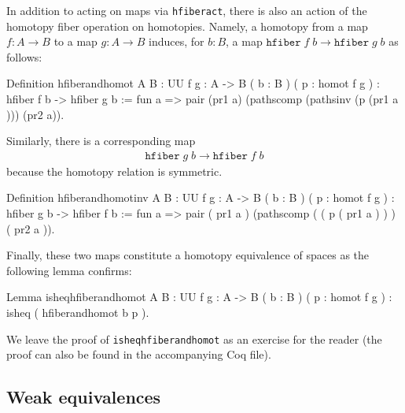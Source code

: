 In addition to acting on maps via \verb|hfiberact|, there is also
an action of the homotopy fiber operation on homotopies.  Namely, a
homotopy from a map $f:A\to B$ to a map $g:A\to B$ induces, for $b :
B$, a map $\texttt{hfiber}\;f\;b\to\texttt{hfiber}\;g\;b$ as follows:
\begin{center}
\begin{coqcode}
Definition hfiberandhomot { A B : UU } { f g : A -> B } ( b : B ) ( p : homot f g ) : hfiber f b -> hfiber g b := fun a => pair (pr1 a) (pathscomp (pathsinv (p (pr1 a ))) (pr2 a)). 
\end{coqcode}
\end{center}
Similarly, there is a corresponding map
\begin{align*}
  \texttt{hfiber}\;g\;b\to\texttt{hfiber}\;f\;b
\end{align*}
because the homotopy relation is symmetric.
\begin{center}
\begin{coqcode}
Definition hfiberandhomotinv { A B : UU } { f g : A -> B } ( b : B ) ( p : homot f g ) : hfiber g b -> hfiber f b := fun a => pair ( pr1 a ) (pathscomp ( ( p ( pr1 a ) ) ) ( pr2 a )). 
\end{coqcode}
\end{center}
Finally, these two maps constitute a homotopy equivalence of spaces as
the following lemma confirms:
\begin{center}
\begin{coqcode}
Lemma isheqhfiberandhomot { A B : UU } { f g : A -> B } ( b : B ) ( p : homot f g ) : isheq ( hfiberandhomot b p ).
\end{coqcode}
\end{center}
We leave the proof of \verb|isheqhfiberandhomot| as an exercise
for the reader (the proof can also be found in the accompanying Coq
file). 

\subsection{Weak equivalences}\label{section:weq_def}

